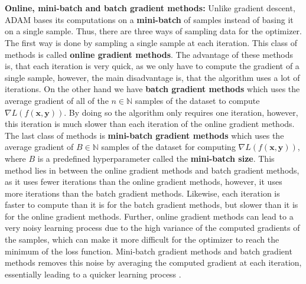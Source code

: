 \documentclass[./main.tex]{subfiles}
\begin{document}
\\
\\
\noindent \textbf{Online, mini-batch and batch gradient methods:} Unlike gradient descent, ADAM bases its computations on a \textbf{mini-batch} of samples instead of basing it on a single sample. Thus, there are three ways of sampling data for the optimizer. The first way is done by sampling a single sample at each iteration. This class of methods is called \textbf{online gradient methods}. The advantage of these methods is, that each iteration is very quick, as we only have to compute the gradient of a single sample, however, the main disadvantage is, that the algorithm uses a lot of iterations. On the other hand we have \textbf{batch gradient methods} which uses the average gradient of all of the $n \in \mathbb{N}$ samples of the dataset to compute $\nabla L(f(\bm{x}, \bm{y}))$. By doing so the algorithm only requires one iteration, however, this iteration is much slower than each iteration of the online gradient methods. The last class of methods is \textbf{mini-batch gradient methods} which uses the average gradient of $B \in \mathbb{N}$ samples of the dataset for computing $\nabla L(f(\bm{x}, \bm{y}))$, where $B$ is a predefined hyperparameter called the \textbf{mini-batch size}. This method lies in between the online gradient methods and batch gradient methods, as it uses fewer iterations than the online gradient methods, however, it uses more iterations than the batch gradient methods. Likewise, each iteration is faster to compute than it is for the batch gradient methods, but slower than it is for the online gradient methods. Further, online gradient methods can lead to a very noisy learning process due to the high variance of the computed gradients of the samples, which can make it more difficult for the optimizer to reach the minimum of the loss function. Mini-batch gradient methods and batch gradient methods removes this noise by averaging the computed gradient at each iteration, essentially leading to a quicker learning process \cite{DL_book}. 
\\
\\
\end{document}
